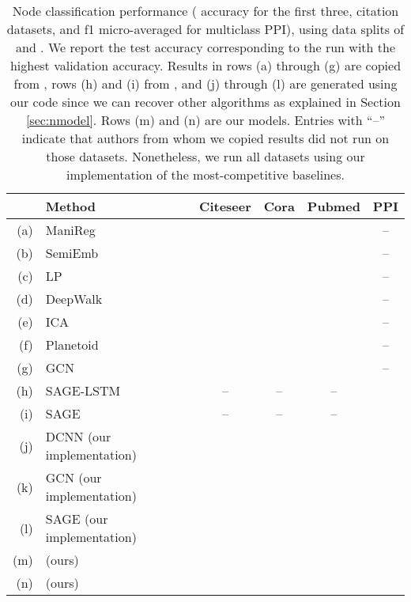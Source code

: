 \begin{table*}[t]
\begin{center}
\begin{tabular}{rlcccc}
& \textbf{Method}  & \textbf{Citeseer} & \textbf{Cora} & \textbf{Pubmed} & \textbf{PPI} \\ \hline
(a) & ManiReg \citep{manireg}&  &  &  & --\\ 

(b) & SemiEmb \citep{semiemb}&  &  &  & --\\ 

(c) & LP \citep{lp}&  &  &  & --\\ 

(d) & DeepWalk \citep{deepwalk}&  &  &  & --\\ 

(e) & ICA \citep{ica}&  &  &  & --\\ 

(f) & Planetoid \citep{planetoid}&  &  &  & --\\ 

(g) & GCN \citep{kipf}&  &  &  & --\\ 

(h) & SAGE-LSTM \citep{sage}& --& --& --&  \\ 

(i) & SAGE \citep{sage}& --& --& --&  \\ 

\hline
(j) & DCNN (our implementation)&  &  &  &  \\ 

(k) & GCN (our implementation)&  &  &  &  \\ 

(l) & SAGE (our implementation)&  &  &  &  \\ 

\hline
(m) &  (ours)&  &  &  &  \\ 

(n) &  (ours)&  &  &  &  \\ 

\end{tabular}
 \end{center}
\caption{
Node classification performance ( accuracy for the first three, citation datasets, and f1 micro-averaged for multiclass PPI), using data splits of \cite{planetoid, kipf} and \cite{sage}.
We report the test accuracy corresponding to the run with the highest validation accuracy.
Results in rows (a) through (g) are copied from \cite{kipf}, rows (h) and (i) from \citep{sage}, and (j) through (l) are generated using our code since we can recover other algorithms as explained in Section \ref{sec:nmodel}. Rows (m) and (n) are our models.
Entries with ``--'' indicate that authors from whom we copied results did not run on those datasets. Nonetheless, we run all datasets using our implementation of the most-competitive baselines.
}
\label{table:results}
\end{table*}

